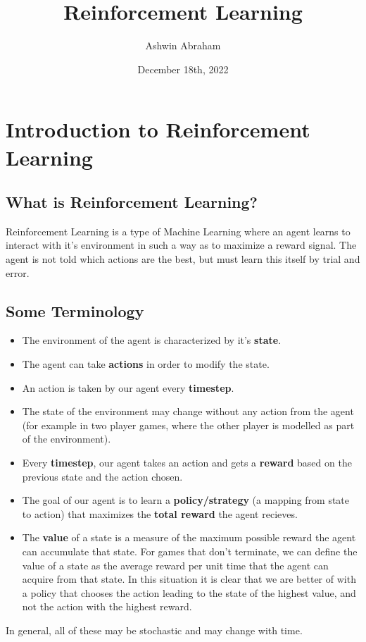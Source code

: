 \documentclass[12pt]{report}
\title{\Huge \textbf{Reinforcement Learning}}
\author{\Large Ashwin Abraham}
\date{\Large December 18th, 2022}
\begin{document}
\begin{titlepage}
    \maketitle
\end{titlepage}

\tableofcontents
\newpage

\chapter{Introduction to Reinforcement Learning}
\section{What is Reinforcement Learning?}
Reinforcement Learning is a type of Machine Learning where an agent learns to interact with it's environment in such a way as to maximize a reward signal.
The agent is not told which actions are the best, but must learn this itself by trial and error.

\section{Some Terminology}
\begin{itemize}
    \item The environment of the agent is characterized by it's \textbf{state}.
    \item The agent can take \textbf{actions} in order to modify the state.
    \item An action is taken by our agent every \textbf{timestep}.
    \item The state of the environment may change without any action from the agent (for example in two player games, where the other player is modelled as part of the environment).
    \item Every \textbf{timestep}, our agent takes an action and gets a \textbf{reward} based on the previous state and the action chosen.
    \item The goal of our agent is to learn a \textbf{policy/strategy} (a mapping from state to action) that maximizes the \textbf{total reward} the agent recieves.
    \item The \textbf{value} of a state is a measure of the maximum possible reward the agent can accumulate that state. For games that don't terminate, we can
    define the value of a state as the average reward per unit time that the agent can acquire from that state. In this situation it is clear that we are better of with a policy that chooses the 
    action leading to the state of the highest value, and not the action with the highest reward.
\end{itemize}
In general, all of these may be stochastic and may change with time.
\end{document}
